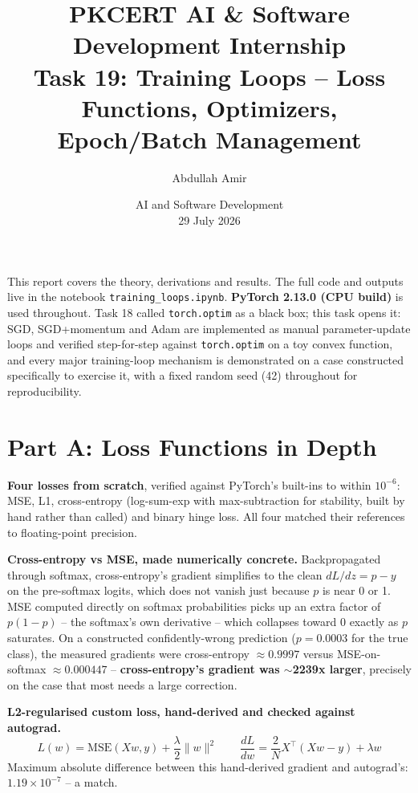 \documentclass[11pt,a4paper]{article}
\title{\vspace{-1.5cm}\textbf{PKCERT AI \& Software Development Internship \\ Task 19: Training Loops -- Loss Functions, Optimizers, Epoch/Batch Management}}
\author{Abdullah Amir}
\date{AI and Software Development \\ 29 July 2026}
\begin{document}
\maketitle
\vspace{-0.8cm}

This report covers the theory, derivations and results. The full code and outputs live
in the notebook \texttt{training\_loops.ipynb}. \textbf{PyTorch 2.13.0 (CPU build)} is
used throughout. Task 18 called \texttt{torch.optim} as a black box; this task opens it:
SGD, SGD+momentum and Adam are implemented as manual parameter-update loops and verified
step-for-step against \texttt{torch.optim} on a toy convex function, and every major
training-loop mechanism is demonstrated on a case constructed specifically to exercise
it, with a fixed random seed (42) throughout for reproducibility.

\section*{Part A: Loss Functions in Depth}

\textbf{Four losses from scratch}, verified against PyTorch's built-ins to within
$10^{-6}$: MSE, L1, cross-entropy (log-sum-exp with max-subtraction for stability, built
by hand rather than called) and binary hinge loss. All four matched their references to
floating-point precision.

\textbf{Cross-entropy vs MSE, made numerically concrete.} Backpropagated through
softmax, cross-entropy's gradient simplifies to the clean $dL/dz = p - y$ on the
pre-softmax logits, which does not vanish just because $p$ is near 0 or 1. MSE computed
directly on softmax probabilities picks up an extra factor of $p(1-p)$ -- the softmax's
own derivative -- which collapses toward 0 exactly as $p$ saturates. On a constructed
confidently-wrong prediction ($p=0.0003$ for the true class), the measured gradients
were cross-entropy $\approx 0.9997$ versus MSE-on-softmax $\approx 0.000447$ --
\textbf{cross-entropy's gradient was $\sim$2239x larger}, precisely on the case that
most needs a large correction.

\textbf{L2-regularised custom loss, hand-derived and checked against autograd.}
\[
L(w) = \text{MSE}(Xw, y) + \frac{\lambda}{2}\|w\|^2 \qquad
\frac{dL}{dw} = \frac{2}{N}X^\top(Xw - y) + \lambda w
\]
Maximum absolute difference between this hand-derived gradient and autograd's:
$1.19\times10^{-7}$ -- a match.
\end{document}
